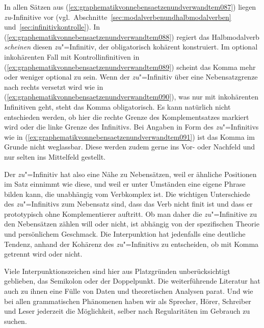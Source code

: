 In allen Sätzen aus (\ref{ex:graphematikvonnebensaetzenundverwandtem087}) liegen \textit{zu}-Infinitive vor (vgl.\ Abschnitte~\ref{sec:modalverbenundhalbmodalverben} und~\ref{sec:infinitivkontrolle}).
In (\ref{ex:graphematikvonnebensaetzenundverwandtem088}) regiert das Halbmodalverb \textit{scheinen} diesen \textit{zu}"=Infinitiv, der obligatorisch kohärent konstruiert.
Im optional inkohärenten Fall mit Kontrollinfinitiven in (\ref{ex:graphematikvonnebensaetzenundverwandtem089}) scheint das Komma mehr oder weniger optional zu sein.
Wenn der \textit{zu}"=Infinitiv über eine Nebensatzgrenze nach rechts versetzt wird wie in (\ref{ex:graphematikvonnebensaetzenundverwandtem090}), was nur mit inkohärenten Infinitiven geht, steht das Komma obligatorisch.
Es kann natürlich nicht entschieden werden, ob hier die rechte Grenze des Komplementsatzes markiert wird oder die linke Grenze des Infinitivs.
Bei Angaben in Form des \textit{zu}"=Infinitivs wie in (\ref{ex:graphematikvonnebensaetzenundverwandtem091}) ist das Komma im Grunde nicht weglassbar.
Diese werden zudem gerne ins Vor- oder Nachfeld und nur selten ins Mittelfeld gestellt.

Der \textit{zu}"=Infinitiv hat also eine Nähe zu Nebensätzen, weil er ähnliche Positionen im Satz einnimmt wie diese, und weil er unter Umständen eine eigene Phrase bilden kann, die unabhängig vom Verbkomplex ist.
Die wichtigen Unterschiede des \textit{zu}"=Infinitivs zum Nebensatz sind, dass das Verb nicht finit ist und dass er prototypisch ohne Komplementierer auftritt.
Ob man daher die \textit{zu}"=Infinitive zu den Nebensätzen zählen will oder nicht, ist abhängig von der spezifischen Theorie und persönlichem Geschmack.
Die Interpunktion hat jedenfalls eine deutliche Tendenz, anhand der Kohärenz des \textit{zu}"=Infinitivs zu entscheiden, ob mit Komma getrennt wird oder nicht.

Viele Interpunktionszeichen sind hier aus Platzgründen unberücksichtigt geblieben, \zB das Semikolon oder der Doppelpunkt.
Die weiterführende Literatur hat auch zu ihnen eine Fülle von Daten und theoretischen Analysen parat.
Und wie bei allen grammatischen Phänomenen haben wir als Sprecher, Hörer, Schreiber und Leser jederzeit die Möglichkeit, selber nach Regularitäten im Gebrauch zu suchen.


